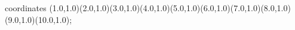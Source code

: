 					coordinates { (1.0,1.0)(2.0,1.0)(3.0,1.0)(4.0,1.0)(5.0,1.0)(6.0,1.0)(7.0,1.0)(8.0,1.0)(9.0,1.0)(10.0,1.0)};